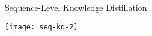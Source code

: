 







\begin{frame}{Sequence-Level Knowledge Distillation}


  \begin{center}
    \texttt{[image: seq-kd-2]}
  \end{center}
\end{frame}

